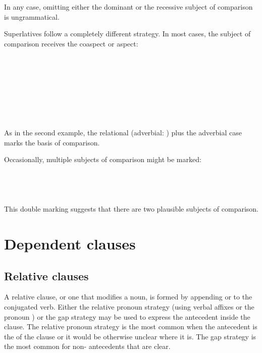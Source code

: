 \documentclass{book}
\begin{document}
In any case, omitting either the dominant or the recessive subject of comparison is ungrammatical.

Superlatives follow a completely different strategy. In most cases, the subject of comparison receives the  coaspect or aspect: \\
~\\
    \\
    \\
    \\
~\\
   \\
   \\
   \\

As in the second example, the relational  (adverbial: ) plus the adverbial case marks the basis of comparison.

Occasionally, multiple subjects of comparison might be marked: \\
~\\
   \\
   \\
   \\

This double marking suggests that there are two plausible subjects of comparison.

\section{Dependent clauses}

\subsection{Relative clauses}

A relative clause, or one that modifies a noun, is formed by appending  or  to the conjugated verb. Either the relative pronoun strategy (using verbal affixes or the pronoun ) or the gap strategy may be used to express the antecedent inside the clause. The relative pronoun strategy is the most common when the antecedent is the  of the clause or it would be otherwise unclear where it is. The gap strategy is the most common for non- antecedents that are clear.
\end{document}
